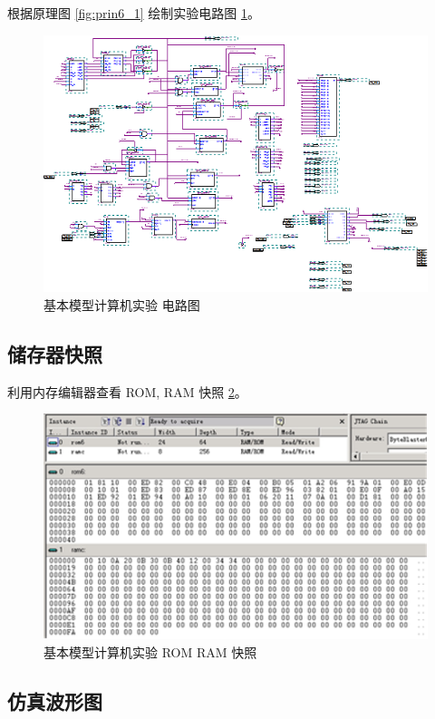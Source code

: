 根据原理图 \ref{fig:prin6_1} 绘制实验电路图 \ref{fig:bdf6}。

\begin{figure}[H]
\centering
\includegraphics[width=\textwidth]{images/bdf6.png}
\caption{基本模型计算机实验 电路图}
\label{fig:bdf6}
\end{figure}

\subsection{储存器快照}

利用内存编辑器查看 ROM, RAM 快照 \ref{fig:mem6}。

\begin{figure}[H]
\centering
\includegraphics[width=\textwidth]{images/mem6.png}
\caption{基本模型计算机实验 ROM RAM 快照}
\label{fig:mem6}
\end{figure}

\subsection{仿真波形图}

